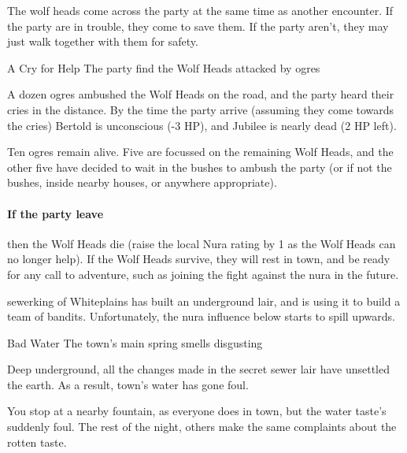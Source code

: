 \begin{multicols}{2}
The wolf heads come across the party at the same time as another encounter.
If the party are in trouble, they come to save them.
If the party aren't, they may just walk together with them for safety.

{A Cry for Help}%
{The party find the Wolf Heads attacked by ogres}%

A dozen ogres ambushed the Wolf Heads on the road, and the party heard their cries in the distance.
By the time the party arrive (assuming they come towards the cries) Bertold is unconscious (-3 HP), and Jubilee is nearly dead (2 HP left).

Ten ogres remain alive.
Five are focussed on the remaining Wolf Heads, and the other five have decided to wait in the bushes to ambush the party (or if not the bushes, inside nearby houses, or anywhere appropriate).

\paragraph{\N If the party leave}
then the Wolf Heads die (raise the local Nura rating by 1 as the Wolf Heads can no longer help).
If the Wolf Heads survive, they will rest in \gls{town}, and be ready for any call to adventure, such as joining the fight against the nura in the future.



\stopcontents[sq]

\label{sewerking}

\startcontents[sq]

\sqminitoc

\noindent
\Gls{sewerking} of Whiteplains has built an underground lair, and is using it to build a team of bandits.
Unfortunately, the nura influence below starts to spill upwards.

{\squash\N Bad Water}%
{The town's main spring smells disgusting}%

Deep underground, all the changes made in the secret sewer lair have unsettled the earth.
As a result, \gls{town}'s water has gone foul.

\begin{boxtext}

  You stop at a nearby fountain, as everyone does in \gls{town}, but the water taste's suddenly foul.
  The rest of the night, others make the same complaints about the rotten taste.


\end{boxtext}
\end{multicols}
